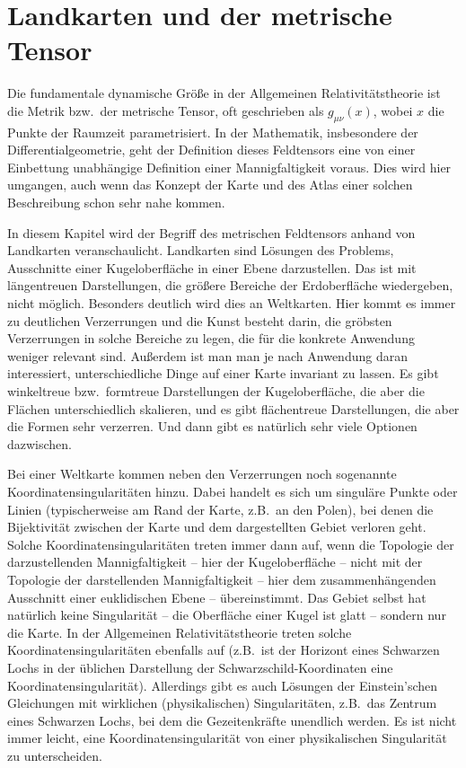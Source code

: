 
\chapter{Landkarten und der metrische Tensor}
\label{chap_Landkarte}

%
Die fundamentale dynamische Gr\"o\ss e in der Allgemeinen Relativit\"atstheorie
ist die Metrik bzw.\ der metrische Tensor, oft geschrieben als $g_{\mu \nu}(x)$, wobei
$x$ die Punkte der Raumzeit parametrisiert. 
In der Mathematik, insbesondere der Differentialgeometrie, geht der
Definition dieses Feldtensors
eine von einer Einbettung unabh\"angige Definition einer Mannigfaltigkeit voraus.
Dies wird hier umgangen, auch wenn das Konzept der Karte und des Atlas einer
solchen Beschreibung schon sehr nahe kommen.  

In diesem Kapitel wird der Begriff des metrischen Feldtensors anhand von 
Landkarten
veranschaulicht. Landkarten sind L\"osungen des Problems, Ausschnitte einer Kugeloberfl\"ache
in einer Ebene darzustellen. Das ist mit l\"angentreuen Darstellungen, die gr\"o\ss ere Bereiche der
Erdoberfl\"ache wiedergeben, nicht m\"oglich. Besonders deutlich wird dies an Weltkarten. 
Hier kommt es immer zu deutlichen Verzerrungen und die Kunst besteht darin, die gr\"obsten Verzerrungen
in solche Bereiche zu legen, die f\"ur die konkrete Anwendung weniger relevant sind. Au\ss erdem ist man
man je nach Anwendung daran interessiert, unterschiedliche Dinge auf einer Karte
invariant zu lassen. Es gibt winkeltreue bzw.\ formtreue Darstellungen der Kugeloberfl\"ache, die
aber die Fl\"achen unterschiedlich skalieren, und es gibt fl\"achentreue Darstellungen, die
aber die Formen sehr verzerren. Und dann gibt es nat\"urlich sehr viele Optionen
dazwischen. 

Bei einer Weltkarte kommen neben den Verzerrungen noch sogenannte Koordinatensingularit\"aten
hinzu. 
Dabei handelt es sich um singul\"are Punkte oder Linien (typischerweise am Rand der
Karte, z.B.\ an den Polen), bei denen die Bijektivit\"at zwischen der Karte und dem dargestellten
Gebiet verloren geht. Solche Koordinatensingularit\"aten treten immer dann auf, wenn die
Topologie der darzustellenden Mannigfaltigkeit -- hier der Kugeloberfl\"ache -- nicht mit der 
Topologie der darstellenden Mannigfaltigkeit -- hier dem zusammenh\"angenden Ausschnitt einer euklidischen
Ebene -- \"ubereinstimmt. Das Gebiet selbst hat nat\"urlich keine Singularit\"at -- die Oberfl\"ache einer
Kugel ist glatt -- sondern nur die Karte. In der Allgemeinen Relativit\"atstheorie treten solche
Koordinatensingularit\"aten ebenfalls auf (z.B.\ ist der Horizont eines Schwarzen Lochs in der
\"ublichen Darstellung der Schwarzschild-Koordinaten eine Koordinatensingularit\"at). Allerdings
gibt es auch L\"osungen der Einstein'schen Gleichungen mit wirklichen (physikalischen) Singularit\"aten,
z.B.\ das Zentrum eines Schwarzen Lochs, bei dem die Gezeitenkr\"afte unendlich werden. Es ist
nicht immer leicht, eine Koordinatensingularit\"at von einer physikalischen Singularit\"at zu unterscheiden.

